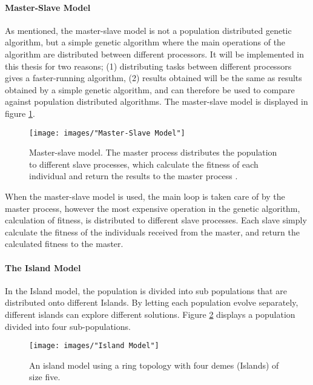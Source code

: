 \paragraph*{Master-Slave Model}
As mentioned, the master-slave model is not a population distributed genetic algorithm, but a simple genetic algorithm where the main operations of the algorithm are distributed between different processors. It will be implemented in this thesis for two reasons; (1) distributing tasks between different processors gives a faster-running algorithm, (2) results obtained will be the same as results obtained by a simple genetic algorithm, and can therefore be used to compare against population distributed algorithms. The master-slave model is displayed in figure \ref{Master-Slave Model}.\\


\begin{figure}[h!]
\begin{center}
\texttt{[image: images/"Master-Slave Model"]}
\caption{Master-slave model. The master process distributes the population to different slave processes, which calculate the fitness of each individual and return the results to the master process \citep{Gong}.}
\label{Master-Slave Model}
\end{center}
\end{figure}


\noindent When the master-slave model is used, the main loop is taken care of by the master process, however the most expensive operation in the genetic algorithm, calculation of fitness, is distributed to different slave processes. Each slave simply calculate the fitness of the individuals received from the master, and return the calculated fitness to the master. 


\paragraph*{The Island Model}
In the Island model, the population is divided into sub populations that are distributed onto different Islands. By letting each population evolve separately, different islands can explore different solutions. Figure \ref{Island model} displays a population divided into four sub-populations. \\ 


\begin{figure}[h!]
\begin{center}
\texttt{[image: images/"Island Model"]}
\caption{An island model using a ring topology with four demes (Islands) of size five. \citep{Gong}}
\label{Island model}
\end{center}
\end{figure}


